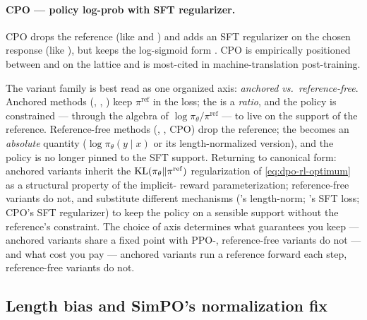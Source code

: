 \paragraph{CPO --- policy log-prob with SFT regularizer.} CPO drops the
reference (like  and ) and adds an SFT regularizer on the
chosen response (like ), but keeps the  log-sigmoid form
\citep[Xu et al.\ 2024]{rafailov2023-dpo}.
 CPO is
empirically positioned between  and  on the lattice and is
most-cited in machine-translation post-training.

\begin{analogy}
The variant family is best read as one organized axis: \emph{anchored
vs.\ reference-free}. Anchored methods (, , ) keep
$\pi^{\mathrm{ref}}$ in the loss; the  is a
\emph{ratio}, and the policy is constrained --- through the algebra of
$\log \pi_\theta / \pi^{\mathrm{ref}}$ --- to live on the support of
the reference. Reference-free methods (, , CPO) drop the
reference; the  becomes an \emph{absolute} quantity
($\log \pi_\theta(y \mid x)$ or its length-normalized version), and
the policy is no longer pinned to the SFT support. Returning to
canonical form: anchored variants inherit the
$\operatorname{KL}(\pi_\theta \| \pi^{\mathrm{ref}})$ regularization of
\cref{eq:dpo-rl-optimum} as a structural property of the implicit-
reward parameterization; reference-free variants do not, and
substitute different mechanisms ('s length-norm; 's SFT loss;
CPO's SFT regularizer) to keep the policy on a sensible support
without the reference's constraint. The choice of axis determines what
guarantees you keep --- anchored variants share a fixed point with
PPO-, reference-free variants do not --- and what cost you pay ---
anchored variants run a reference forward each step, reference-free
variants do not.
\end{analogy}

\subsection{Length bias and SimPO's normalization fix}
\label{sec:dpo-length}


